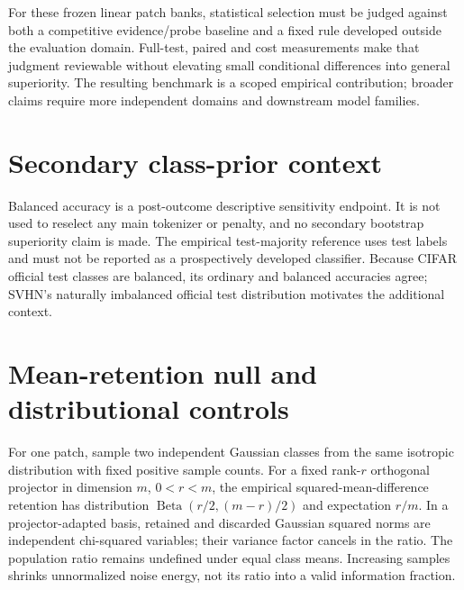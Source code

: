 \documentclass[11pt]{article}
\begin{document}
For these frozen linear patch banks, statistical selection must be judged against both a competitive evidence/probe baseline and a fixed rule developed outside the evaluation domain. Full-test, paired and cost measurements make that judgment reviewable without elevating small conditional differences into general superiority. The resulting benchmark is a scoped empirical contribution; broader claims require more independent domains and downstream model families.

\clearpage
\appendix


\section{Secondary class-prior context}

Balanced accuracy is a post-outcome descriptive sensitivity endpoint. It is not used to reselect any main tokenizer or penalty, and no secondary bootstrap superiority claim is made. The empirical test-majority reference uses test labels and must not be reported as a prospectively developed classifier. Because CIFAR official test classes are balanced, its ordinary and balanced accuracies agree; SVHN's naturally imbalanced official test distribution motivates the additional context.

\section{Mean-retention null and distributional controls}
For one patch, sample two independent Gaussian classes from the same isotropic distribution with fixed positive sample counts. For a fixed rank-$r$ orthogonal projector in dimension $m$, $0<r<m$, the empirical squared-mean-difference retention has distribution $\operatorname{Beta}(r/2,(m-r)/2)$ and expectation $r/m$. In a projector-adapted basis, retained and discarded Gaussian squared norms are independent chi-squared variables; their variance factor cancels in the ratio. The population ratio remains undefined under equal class means. Increasing samples shrinks unnormalized noise energy, not its ratio into a valid information fraction.
\end{document}
